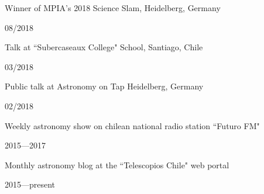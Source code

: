 \documentclass[12pt, a4paper]{article} %
\begin{document}
\begin{minipage}[t]{0.7\textwidth}
\begin{flushleft}%
  \setlength{\leftskip}{0.2cm}%
Winner of MPIA's 2018 Science Slam, Heidelberg, Germany 
\end{flushleft}
\end{minipage}
\begin{minipage}[t]{0.3\textwidth}
\hfill 08/2018
\end{minipage}

\begin{minipage}[t]{0.7\textwidth}
\begin{flushleft}%
  \setlength{\leftskip}{0.2cm}%
Talk at ``Subercaseaux College" School, Santiago, Chile
\end{flushleft}
\end{minipage}
\begin{minipage}[t]{0.3\textwidth}
\hfill 03/2018
\end{minipage}

\begin{minipage}[t]{0.7\textwidth}
\begin{flushleft}%
  \setlength{\leftskip}{0.2cm}%
Public talk at Astronomy on Tap Heidelberg, Germany 
\end{flushleft}
\end{minipage}
\begin{minipage}[t]{0.3\textwidth}
\hfill 02/2018
\end{minipage}

\begin{minipage}[t]{0.7\textwidth}
\begin{flushleft}%
  \setlength{\leftskip}{0.2cm}%
Weekly astronomy show on chilean national radio station ``Futuro FM"
\end{flushleft}
\end{minipage}
\begin{minipage}[t]{0.3\textwidth}
\hfill 2015---2017
\end{minipage}


\begin{minipage}[t]{0.7\textwidth}
\begin{flushleft}%
  \setlength{\leftskip}{0.2cm}%
Monthly astronomy blog at the ``Telescopios Chile" web portal
\end{flushleft}
\end{minipage}
\begin{minipage}[t]{0.3\textwidth}
\hfill 2015---present
\end{minipage}
\end{document}

